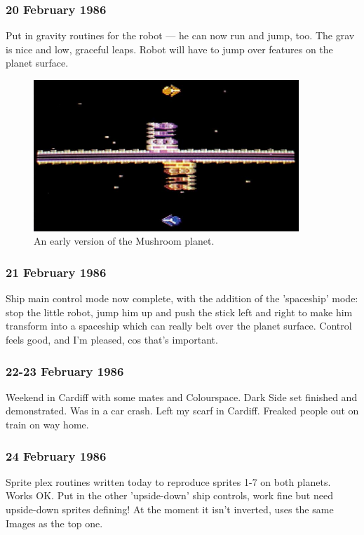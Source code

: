 \subsubsection{20 February 1986}
Put in gravity routines for the robot — he can now run and jump, too. The grav is nice and low, graceful leaps. Robot will have to jump over features on the planet surface.

\begin{figure}[H]
    \centering
      \includegraphics[width=10cm]{src/diary/zzap13_pic2.jpg}%
\caption{An early version of the Mushroom planet.}
\end{figure}

\subsubsection{21 February 1986}
Ship main control mode now complete, with the addition of the 'spaceship' mode: stop the little robot, jump him up and push the stick left and right to make him transform into a spaceship which can really belt over the planet surface. Control feels good, and I'm pleased, cos that's important.

\subsubsection{22-23 February 1986}
Weekend in Cardiff with some mates and Colourspace. Dark Side set finished and demonstrated. Was in a car crash. Left my scarf in Cardiff. Freaked people out on train on way home.

\subsubsection{24 February 1986}
Sprite plex routines written today to reproduce sprites 1-7 on both planets. Works OK. Put in the other 'upside-down' ship controls, work fine but need upside-down sprites defining! At the moment it isn't inverted, uses the same Images as the top one.

